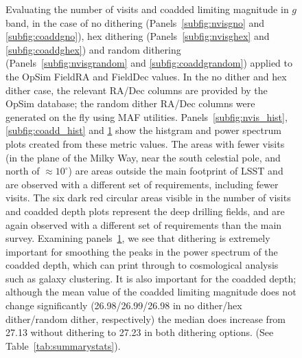 \documentclass[]{spie}  %
\begin{document}
\begin{figure}
\begin{subfigure}[]{0.3\textwidth}
\caption[]{}
\label{subfig:coadd_ps}
\end{subfigure}
\caption[]
{\label{fig:dither_nvis_coadd}
Evaluating the number of visits and coadded limiting magnitude in $g$
band, in the case of no dithering (Panels~\ref{subfig:nvisgno} and
\ref{subfig:coaddgno}), hex dithering (Panels~\ref{subfig:nvisghex}
and \ref{subfig:coaddghex}) and random dithering
(Panels~\ref{subfig:nvisgrandom} and \ref{subfig:coaddgrandom})
applied to the OpSim FieldRA and FieldDec values. In the no dither and
hex dither case, the relevant RA/Dec columns are provided by the OpSim
database; the random dither RA/Dec columns were generated on the fly
using MAF utilities. Panels~\ref{subfig:nvis_hist},
\ref{subfig:coadd_hist} and \ref{subfig:coadd_ps} show the histgram
and power spectrum plots created from these metric values. The areas
with fewer visits (in the plane of the Milky Way, near the south
celestial pole, and north of
$\approx 10^{\circ}$) are areas
outside the main footprint of LSST and are observed with a different
set of requirements, including fewer visits. The six dark red circular
areas visible in the number of visits and coadded depth plots
represent the deep drilling fields, and are again observed with a
different set of requirements than the main survey. Examining
panels~\ref{subfig:coadd_ps}, we see that dithering
is extremely important for smoothing the peaks in the power spectrum
of the coadded depth, which can print through to cosmological analysis
such as galaxy clustering. It is also important for the coadded depth;
although the mean value of the coadded limiting magnitude does not
change significantly (26.98/26.99/26.98 in no dither/hex dither/random
dither, respectively) the median does increase from 27.13 without
dithering to 27.23 in both dithering options. (See Table~\ref{tab:summarystats}).}
\end{figure}
\end{document}
